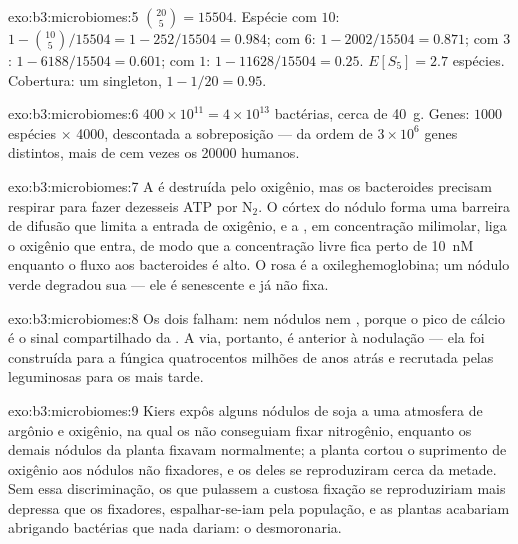\begin{solution}{exo:b3:microbiomes:5}
$\binom{20}{5} = \num{15504}$. Espécie com $10$: $1 - \binom{10}{5}/
\num{15504} = 1 - 252/\num{15504} = 0.984$; com $6$: $1 - 2002/\num{15504}
= 0.871$; com $3$: $1 - 6188/\num{15504} = 0.601$; com $1$: $1 -
\num{11628}/\num{15504} = 0.25$. $E[S_{5}] = 2.7$ espécies. Cobertura:
um singleton, $1 - 1/20 = 0.95$.
\end{solution}

\begin{solution}{exo:b3:microbiomes:6}
$400\times 10^{11} = 4\times 10^{13}$ bactérias, cerca de \qty{40}{g}.
Genes: $1000$ espécies $\times$ \num{4000}, descontada a sobreposição
--- da ordem de $3\times 10^{6}$ genes distintos, mais de cem vezes os
\num{20000} humanos.
\end{solution}

\begin{solution}{exo:b3:microbiomes:7}
A  é destruída pelo oxigênio, mas os bacteroides precisam
respirar para fazer dezesseis ATP por N$_{2}$. O córtex do nódulo forma
uma barreira de difusão que limita a entrada de oxigênio, e a
, em concentração milimolar, liga o oxigênio que entra,
de modo que a concentração livre fica perto de \qty{10}{nM} enquanto o
fluxo aos bacteroides é alto. O rosa é a oxileghemoglobina; um nódulo
verde degradou sua  --- ele é senescente e já não fixa.
\end{solution}

\begin{solution}{exo:b3:microbiomes:8}
Os dois falham: nem nódulos nem , porque o pico de
cálcio é o sinal compartilhado da . A via,
portanto, é anterior à nodulação --- ela foi construída para a 
fúngica quatrocentos milhões de anos atrás e recrutada pelas
leguminosas para os  mais tarde.
\end{solution}

\begin{solution}{exo:b3:microbiomes:9}
Kiers expôs alguns nódulos de soja a uma atmosfera de argônio e
oxigênio, na qual os  não conseguiam fixar nitrogênio, enquanto
os demais nódulos da planta fixavam normalmente; a planta cortou o
suprimento de oxigênio aos nódulos não fixadores, e os  deles
se reproduziram cerca da metade. Sem essa discriminação, os 
que pulassem a custosa fixação se reproduziriam mais depressa que os
fixadores, espalhar-se-iam pela população, e as plantas acabariam
abrigando bactérias que nada dariam: o  desmoronaria.
\end{solution}


